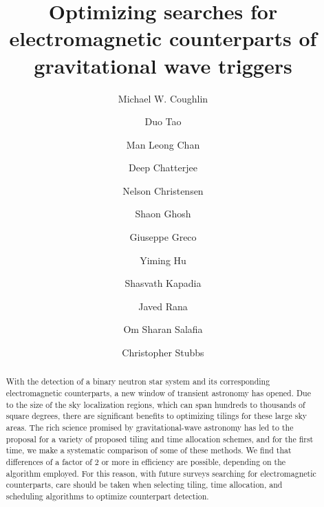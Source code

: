 \documentclass[twocolumn]{aastex62}
\begin{document}
\title{Optimizing searches for electromagnetic counterparts of gravitational wave triggers}

\author{Michael W. Coughlin}

\author{Duo Tao}

\author{Man Leong Chan}

\author{Deep Chatterjee}

\author{Nelson Christensen}

\author{Shaon Ghosh}

\author{Giuseppe Greco}

\author{Yiming Hu}

\author{Shasvath Kapadia}

\author{Javed Rana}

\author{Om Sharan Salafia}

\author{Christopher Stubbs}

\begin{abstract}
With the detection of a binary neutron star system and its corresponding electromagnetic counterparts, a new window of transient astronomy has opened. 
Due to the size of the sky localization regions, which can span hundreds to thousands of square degrees, there are significant benefits to optimizing tilings for these large sky areas.
The rich science promised by gravitational-wave astronomy has led to the proposal for a variety of proposed tiling and time allocation schemes, and for the first time, we make a systematic comparison of some of these methods.
We find that differences of a factor of 2 or more in efficiency are possible, depending on the algorithm employed.
For this reason, with future surveys searching for electromagnetic counterparts, care should be taken when selecting tiling, time allocation, and scheduling algorithms to optimize counterpart detection.

\end{abstract}
\end{document}
